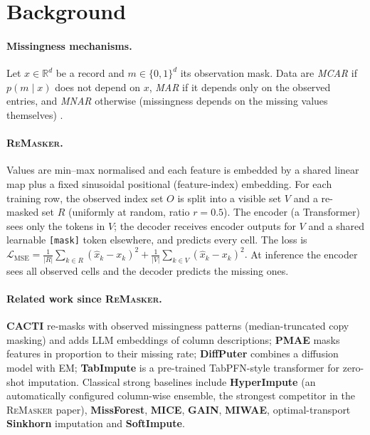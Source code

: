 \documentclass[11pt]{article}
\newcommand{\remasker}{\textsc{ReMasker}}
\begin{document}
\section{Background}
\paragraph{Missingness mechanisms.} Let $x\in\mathbb{R}^d$ be a record and $m\in\{0,1\}^d$ its observation mask. Data are \emph{MCAR} if $p(m\mid x)$ does not depend on $x$, \emph{MAR} if it depends only on the observed entries, and \emph{MNAR} otherwise (missingness depends on the missing values themselves) \citep{little}.

\paragraph{\remasker.} Values are min--max normalised and each feature is embedded by a shared linear map plus a fixed sinusoidal positional (feature-index) embedding. For each training row, the observed index set $O$ is split into a visible set $V$ and a re-masked set $R$ (uniformly at random, ratio $r=0.5$). The encoder (a Transformer) sees only the tokens in $V$; the decoder receives encoder outputs for $V$ and a shared learnable \texttt{[mask]} token elsewhere, and predicts every cell. The loss is
$\mathcal{L}_{\text{MSE}} = \tfrac{1}{|R|}\sum_{k\in R}(\hat x_k-x_k)^2 + \tfrac{1}{|V|}\sum_{k\in V}(\hat x_k-x_k)^2.$
At inference the encoder sees all observed cells and the decoder predicts the missing ones.

\paragraph{Related work since \remasker.} \textbf{CACTI} \citep{cacti} re-masks with observed missingness patterns (median-truncated copy masking) and adds LLM embeddings of column descriptions; \textbf{PMAE} \citep{pmae} masks features in proportion to their missing rate; \textbf{DiffPuter} \citep{diffputer} combines a diffusion model with EM; \textbf{TabImpute} \citep{tabimpute} is a pre-trained TabPFN-style transformer for zero-shot imputation. Classical strong baselines include \textbf{HyperImpute} \citep{hyperimpute} (an automatically configured column-wise ensemble, the strongest competitor in the \remasker{} paper), \textbf{MissForest}, \textbf{MICE}, \textbf{GAIN}, \textbf{MIWAE}, optimal-transport \textbf{Sinkhorn} imputation and \textbf{SoftImpute}.
\end{document}
